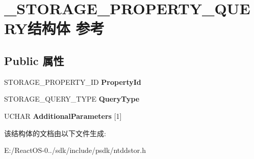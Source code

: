 \hypertarget{struct___s_t_o_r_a_g_e___p_r_o_p_e_r_t_y___q_u_e_r_y}{}\section{\+\_\+\+S\+T\+O\+R\+A\+G\+E\+\_\+\+P\+R\+O\+P\+E\+R\+T\+Y\+\_\+\+Q\+U\+E\+R\+Y结构体 参考}
\label{struct___s_t_o_r_a_g_e___p_r_o_p_e_r_t_y___q_u_e_r_y}
\subsection*{Public 属性}
\begin{DoxyCompactItemize}
\item 
\mbox{\label{struct___s_t_o_r_a_g_e___p_r_o_p_e_r_t_y___q_u_e_r_y_acb74b9c894ff2098e1a00100354a27f5}} 
S\+T\+O\+R\+A\+G\+E\+\_\+\+P\+R\+O\+P\+E\+R\+T\+Y\+\_\+\+ID {\bfseries Property\+Id}
\item 
\mbox{\label{struct___s_t_o_r_a_g_e___p_r_o_p_e_r_t_y___q_u_e_r_y_a551fb4eec6e2a5f2310a353601cc8128}} 
S\+T\+O\+R\+A\+G\+E\+\_\+\+Q\+U\+E\+R\+Y\+\_\+\+T\+Y\+PE {\bfseries Query\+Type}
\item 
\mbox{\label{struct___s_t_o_r_a_g_e___p_r_o_p_e_r_t_y___q_u_e_r_y_a70ce97ee5f89fc8b22d06e9f7cdb9c69}} 
U\+C\+H\+AR {\bfseries Additional\+Parameters} \mbox{[}1\mbox{]}
\end{DoxyCompactItemize}


该结构体的文档由以下文件生成\+:\begin{DoxyCompactItemize}
\item 
E\+:/\+React\+O\+S-\/0../sdk/include/psdk/ntddstor.\+h\end{DoxyCompactItemize}

